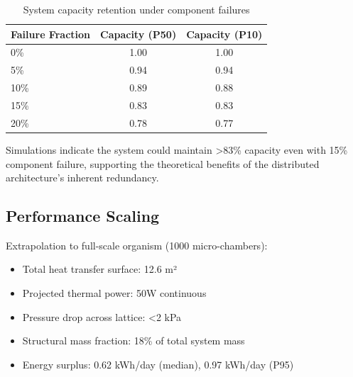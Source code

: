 \begin{table}[H]
\centering
\caption{System capacity retention under component failures}
\begin{tabular}{@{}lcc@{}}
\toprule
Failure Fraction & Capacity (P50) & Capacity (P10) \\
\midrule
0\% & 1.00 & 1.00 \\
5\% & 0.94 & 0.94 \\
10\% & 0.89 & 0.88 \\
15\% & 0.83 & 0.83 \\
20\% & 0.78 & 0.77 \\
\bottomrule
\end{tabular}
\end{table}

Simulations indicate the system could maintain >83\% capacity even with 15\% component failure, supporting the theoretical benefits of the distributed architecture's inherent redundancy.

\subsection{Performance Scaling}

Extrapolation to full-scale organism (1000 micro-chambers):
\begin{itemize}
    \item Total heat transfer surface: 12.6 m²
    \item Projected thermal power: 50W continuous
    \item Pressure drop across lattice: <2 kPa
    \item Structural mass fraction: 18\% of total system mass
    \item Energy surplus: 0.62 kWh/day (median), 0.97 kWh/day (P95)
\end{itemize}